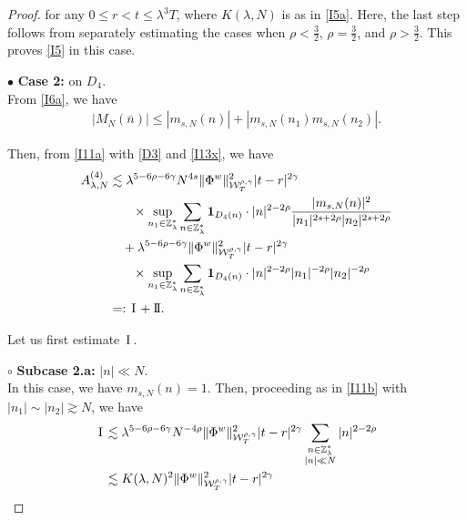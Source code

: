 \documentclass[letterpaper, 11pt,  reqno]{amsart}
\newcommand{\1}{\hspace{0.5mm}\text{I}\hspace{0.5mm}}
\newcommand{\II}{\text{I \hspace{-2.8mm} I} }
\newcommand{\noi}{\noindent}
\newcommand{\Z}{\mathbb{Z}}
\newcommand{\g}{\gamma}
\newcommand{\ld}{\lambda}
\newcommand{\les}{\lesssim}
\newcommand{\ges}{\gtrsim}
\newcommand{\ind}{\mathbf 1}
\newcommand{\W}{\mathcal{W}}
\numberwithin{equation}{section}
\numberwithin{theorem}{section}
\begin{document}
\begin{proof}
 
 \noi
for any $0\leq r<t\leq \ld^3T$, 
where $K(\ld, N)$ is as in \eqref{I5a}. 
Here, the last step follows
from separately estimating 
the cases when $\rho < \frac 32$, 
$\rho = \frac 32$, 
and $\rho > \frac 32$.
This proves
 \eqref{I5} in this case.









\medskip

\noi
$\bullet$ \textbf{Case 2:} on  $D_4$.\\
\indent
From \eqref{I6a}, we have
\begin{align}
|M_N(\bar n)|\le |m_{s, N} (n)| + | m_{s, N} (n_1) m_{s, N}(n_2)|.
\label{I13x}
\end{align}

\noi
Then, from \eqref{I11a} with \eqref{D3}  and \eqref{I13x}, we have 
\begin{align}
\begin{split}
A_{\ld, N}^{(4)}
& \les 
\ld^{5-6\rho -6\g}N^{4s }
\| \Phi^{w} \|^2_{\W_{T}^{\rho, \g}} 
|t-r|^{2\g} \\
& \hphantom{XX}
\times
\sup_{n_1 \in \Z_\ld^*} 
\sum_{n\in \Z_\ld^*} 
\ind_{D_4(n)}\cdot
|n|^{2-2\rho}
\frac{  |m_{s, N}(n)|^2}{|n_1|^{2s + 2\rho}|n_2|^{2s + 2\rho}}\\
& \quad + 
\ld^{5-6\rho -6\g}
\| \Phi^{w} \|^2_{\W_{T}^{\rho, \g}} 
|t-r|^{2\g} \\
& \hphantom{XX}
\times
\sup_{n_1 \in \Z_\ld^*} 
\sum_{n\in \Z_\ld^*} 
\ind_{D_4(n)}\cdot|n|^{2-2\rho}
|n_1|^{- 2\rho}|n_2|^{- 2\rho}\\
 & =: \1 + \II.
\end{split}
\label{I13a}
\end{align}









Let us first estimate $\1$.




\noi
$\circ$ {\bf Subcase 2.a:}  $|n| \ll N$.\\
\indent
In this case, we have $m_{s, N}(n) = 1$.
Then, proceeding as in \eqref{I11b} with $|n_1|\sim |n_2|\ges N$, we have 
\begin{align}
\begin{split}
\1
&\les 
\ld^{5-6\rho -6\g}N^{-4\rho }
\| \Phi^{w} \|^2_{\W_{T}^{\rho, \g}} 
|t-r|^{2\g} 
\sum_{\substack{n \in \Z_\ld^*\\|n|\ll N}} |n|^{2-2\rho} \\
 &\les 
K(\ld, N)^2
 \| \Phi^{w} \|^2_{\W_{T}^{\rho, \g}}  
|t-r|^{2\g}
\end{split}
\label{I14}
\end{align}





\end{proof}
\end{document}

